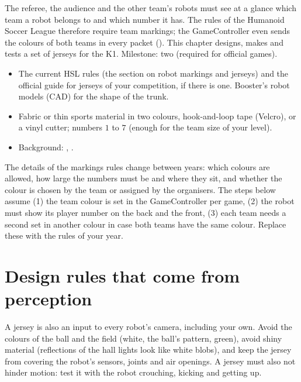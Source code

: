 \label{k:jersey}

The referee, the audience and the other team's robots must see at a glance which team a robot belongs to and which number it has. The rules of the Humanoid Soccer League therefore require team markings; the GameController even sends the colours of both teams in every packet (). This chapter designs, makes and tests a set of jerseys for the K1. Milestone: two (required for official games).

\begin{needbox}
\begin{itemize}[nosep]
  \item The current HSL rules (the section on robot markings and jerseys) and the official guide for jerseys of your competition, if there is one\guess. Booster's robot models (CAD) for the shape of the trunk\guess.
  \item Fabric or thin sports material in two colours, hook-and-loop tape (Velcro), or a vinyl cutter; numbers $1$ to $7$\guess{} (enough for the team size of your level).
  \item Background: , .
\end{itemize}
\end{needbox}

\begin{guessbox}
The details of the markings rules change between years: which colours are allowed, how large the numbers must be and where they sit, and whether the colour is chosen by the team or assigned by the organisers. The steps below assume (1) the team colour is set in the GameController per game, (2) the robot must show its player number on the back and the front, (3) each team needs a second set in another colour in case both teams have the same colour. Replace these with the rules of your year.
\end{guessbox}

\section*{Design rules that come from perception}
A jersey is also an input to every robot's camera, including your own. Avoid the colours of the ball and the field (white, the ball's pattern, green), avoid shiny material (reflections of the hall lights look like white blobs), and keep the jersey from covering the robot's sensors, joints and air openings. A jersey must also not hinder motion: test it with the robot crouching, kicking and getting up.

